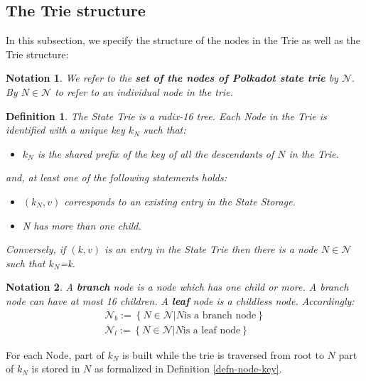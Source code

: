 \documentclass{article}
\newcommand{\assign}{:=}
\newcommand{\tmstrong}[1]{\textbf{#1}}
\newcommand{\tmtextbf}[1]{{\bfseries{#1}}}
\newcommand{\tmtexttt}[1]{{\ttfamily{#1}}}
\newcommand{\tmverbatim}[1]{{\ttfamily{#1}}}
\newenvironment{itemizeminus}{\begin{itemize} \renewcommand{\labelitemi}{$-$}\renewcommand{\labelitemii}{$-$}\renewcommand{\labelitemiii}{$-$}\renewcommand{\labelitemiv}{$-$}}{\end{itemize}}
\newtheorem{definition}{Definition}
\newtheorem{notation}{Notation}
\providecommand{\tmstrong}[1]{\tmtextbf{#1}}
\providecommand{\tmtextbf}[1]{\tmtextbf{#1}}
\providecommand{\tmverbatim}[1]{\tmtexttt{#1}}
\newtheorem{definition}{Definition}
\newtheorem{notation}{Notation}
\begin{document}
\subsection{The Trie structure}

In this subsection, we specify the structure of the nodes in the Trie as well
as the Trie structure:

\begin{notation}
  We refer to the {\tmstrong{set of the nodes of Polkadot state trie}} by
  $\mathcal{N}.$ By $N \in \mathcal{N}$ to refer to an individual node in the
  trie.
\end{notation}

\begin{definition}
  \label{defn-nodetype}The State Trie is a radix-16 tree. Each Node in the
  Trie is identified with a unique key $k_N$ such that:
  \begin{itemizeminus}
    \item $k_N$ is the shared prefix of the key of all the descendants of $N$
    in the Trie.
  \end{itemizeminus}
  and, at least one of the following statements holds:
  \begin{itemizeminus}
    \item $(k_N, v)$ corresponds to an existing entry in the State Storage.
    
    \item N has more than one child.
  \end{itemizeminus}
  \tmverbatim{}Conversely, if $(k, v)$ is an entry in the State Trie then
  there is a node $N \in \mathcal{N}$ such that $k_N$=k.
\end{definition}

\begin{notation}
  A {\tmstrong{branch}} node is a node which has one child or more. A branch
  node can have at most 16 children. A {\tmstrong{leaf}} node is a childless
  node. Accordingly:
  \[ \begin{array}{c}
       \mathcal{N}_b \assign \left\{ N \in \mathcal{N}|N \text{is a branch
       node} \right\}\\
       \mathcal{N}_l \assign \left\{ N \in \mathcal{N}|N \text{is a leaf node}
       \right\}
     \end{array} \]
\end{notation}

For each Node, part of $k_N$ is built while the trie is traversed from root to
$N$ part of $k_N$ is stored in $N$ as formalized in Definition
\ref{defn-node-key}.
\end{document}
